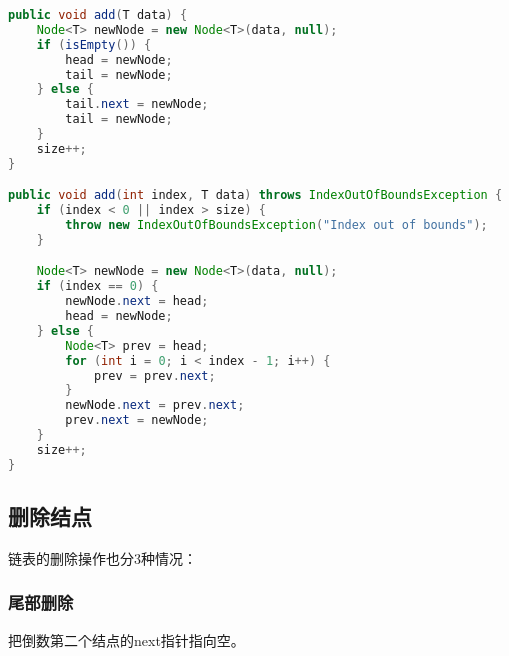 \begin{lstlisting}[language=Java]
public void add(T data) {
	Node<T> newNode = new Node<T>(data, null);
	if (isEmpty()) {
		head = newNode;
		tail = newNode;
	} else {
		tail.next = newNode;
		tail = newNode;
	}
	size++;
}

public void add(int index, T data) throws IndexOutOfBoundsException {
	if (index < 0 || index > size) {
		throw new IndexOutOfBoundsException("Index out of bounds");
	}

	Node<T> newNode = new Node<T>(data, null);
	if (index == 0) {
		newNode.next = head;
		head = newNode;
	} else {
		Node<T> prev = head;
		for (int i = 0; i < index - 1; i++) {
			prev = prev.next;
		}
		newNode.next = prev.next;
		prev.next = newNode;
	}
	size++;
}
\end{lstlisting}

\vspace{0.5cm}

\subsection{删除结点}

链表的删除操作也分3种情况：

\subsubsection{尾部删除}

把倒数第二个结点的next指针指向空。

